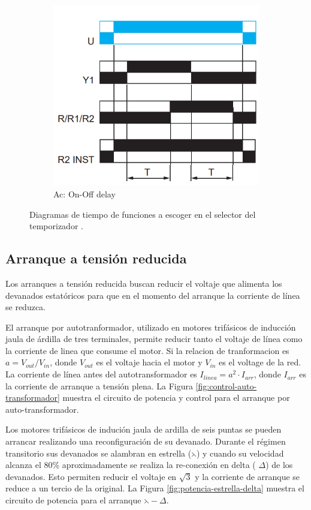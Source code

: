 \begin{figure}
\begin{subfigure}[b]{0.32\textwidth}
	\includegraphics[width=\textwidth]{fig/Ac-On-OffDelay}
	\caption{Ac: On-Off delay }
	\label{fig:OnOff-delay}
	\end{subfigure}
	\caption{Diagramas de tiempo de funciones a escoger en el selector del temporizador \cite{Scheneider4}.}
	\label{fig:Funciones}
\end{figure}

\subsection{Arranque a tensión reducida}

Los arranques a tensión reducida buscan reducir el voltaje que alimenta los devanados estatóricos para que en el momento del arranque la corriente de línea se reduzca.

El arranque por autotranformador, utilizado en motores trifásicos de inducción jaula de árdilla de tres terminales, permite reducir tanto el voltaje de línea como la corriente de linea que consume el motor. Si la relacion de tranformacion es $a=V_{out}/V_{in}$, donde $V_{out}$ es el voltaje hacia el motor y $V_{in}$ es el voltage de la red. La corriente de línea antes del autotransformador es $I_{linea} = a^{2}\cdot I_{arr}$, donde $I_{arr}$ es la corriente de arranque a tensión plena. La Figura \ref{fig:control-auto-transformador} muestra el circuito de potencia y control para el arranque por auto-transformador.

Los motores trifásicos de indución jaula de ardilla de seis puntas se pueden arrancar realizando una reconfiguración de su devanado. Durante el régimen transitorio  sus devanados se alambran en estrella ($\leftthreetimes$) y cuando su velocidad alcanza el 80\% aproximadamente se realiza la re-conexión en delta ( $\Delta$) de los devanados. Esto permiten reducir el voltaje en $\sqrt{3}$ y la corriente de arranque se reduce a un tercio de la original. La Figura \ref{fig:potencia-estrella-delta} muestra el circuito de potencia para el arranque $\leftthreetimes-\Delta$.

